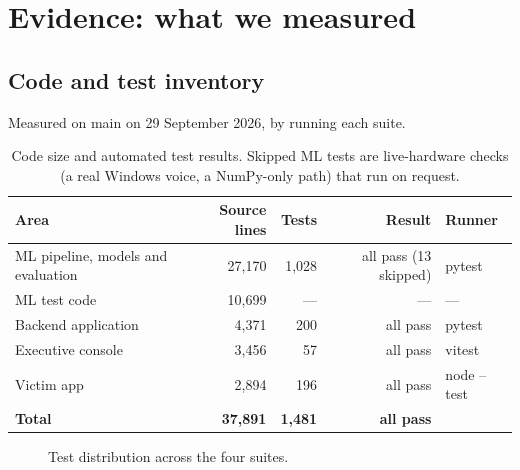 \documentclass[11pt,a4paper]{article}
\newcommand{\codeus}{\textunderscore\allowbreak}
\DeclareRobustCommand{\code}[1]{{\ttfamily\let\_\codeus #1}}
\begin{document}


\section{Evidence: what we measured}
\label{sec:evidence}

\subsection{Code and test inventory}
\label{sec:tests}
Measured on \code{main} on 29 September 2026, by running each suite.

\begin{table}[!htbp]
\centering\small
\caption{Code size and automated test results. Skipped ML tests are live-hardware checks (a real
Windows voice, a NumPy-only path) that run on request.}
\label{tab:tests}
\begin{tabular}{@{}lrrrl@{}}
\toprule
Area & Source lines & Tests & Result & Runner \\
\midrule
ML pipeline, models and evaluation & 27{,}170 & 1{,}028 & all pass (13 skipped) & pytest \\
ML test code & 10{,}699 & --- & --- & --- \\
Backend application & 4{,}371 & 200 & all pass & pytest \\
Executive console & 3{,}456 & 57 & all pass & vitest \\
Victim app & 2{,}894 & 196 & all pass & node --test \\
\midrule
\textbf{Total} & \textbf{37{,}891} & \textbf{1{,}481} & \textbf{all pass} & \\
\bottomrule
\end{tabular}
\end{table}

\begin{figure}[!htbp]
\centering
{}
\caption{Test distribution across the four suites.}
\label{fig:tests}
\end{figure}
\end{document}
